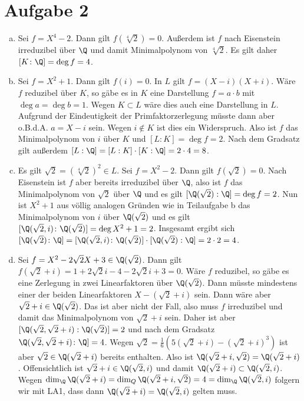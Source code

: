 \documentclass{article}
\begin{document}
    \section*{Aufgabe 2}
    \begin{enumerate}[(a)]
        \item Sei $f = X^4 - 2$. Dann gilt $f(\sqrt[4]{2}) = 0$. 
        Außerdem ist $f$ nach Eisenstein irreduzibel über $\Q$ und damit Minimalpolynom von $\sqrt[4]{2}$.
        Es gilt daher $[K\colon \Q] = \deg f = 4$.
        \item Sei $f = X^2 + 1$. Dann gilt $f(i) = 0$. In $L$ gilt $f = (X - i)(X + i)$. 
        Wäre $f$ reduzibel über $K$, so gäbe es in $K$ eine Darstellung $f = a\cdot b$ mit $\deg a = \deg b = 1$. Wegen $K \subset L$ wäre dies auch eine Darstellung in $L$. Aufgrund der Eindeutigkeit der Primfaktorzerlegung müsste dann aber o.B.d.A. $a = X-i$ sein. Wegen $i \notin K$ ist dies ein Widerspruch. Also ist $f$ das Minimalpolynom von $i$ über $K$ und $[L:K] = \deg f = 2$.
        Nach dem Gradsatz gilt außerdem $[L:\Q] = [L:K] \cdot [K:\Q] = 2 \cdot 4 = 8$.
        \item Es gilt $\sqrt{2} = (\sqrt[4]{2})^2 \in L$. Sei $f = X^2 - 2$. Dann gilt $f(\sqrt{2}) = 0$. Nach Eisenstein ist $f$ aber bereits irreduzibel über $\Q$, also ist $f$ das Minimalpolynom von $\sqrt{2}$ über $\Q$ und es gilt $[\Q(\sqrt{2}):\Q] = \deg f = 2$.
        Nun ist $X^2 + 1$ aus völlig analogen Gründen wie in Teilaufgabe b das Minimalpolynom von $i$ über $\Q(\sqrt{2})$ und es gilt $[\Q(\sqrt{2}, i)\colon \Q(\sqrt{2})] = \deg X^2 + 1 = 2$. Insgesamt ergibt sich $[\Q(\sqrt{2})\colon\Q] = [\Q(\sqrt{2}, i)\colon \Q(\sqrt{2})] \cdot [\Q(\sqrt{2}):\Q] = 2 \cdot 2 = 4$.
        \item Sei $f = X^2 - 2\sqrt{2}X + 3 \in \Q(\sqrt{2})$. Dann gilt $f(\sqrt{2} +i) = 1 + 2\sqrt{2}i - 4 - 2\sqrt{2}i + 3 = 0$. Wäre $f$ reduzibel, so gäbe es eine Zerlegung in zwei Linearfaktoren über $\Q(\sqrt{2})$. Dann müsste mindestens einer der beiden Linearfaktoren $X - (\sqrt{2} + i)$ sein. Dann wäre aber $\sqrt{2} + i \in \Q(\sqrt{2})$. Das ist aber nicht der Fall, also muss $f$ irreduzibel und damit das Minimalpolynom von $\sqrt{2} + i$ sein. Daher ist aber $[\Q(\sqrt{2}, \sqrt{2} + i): \Q(\sqrt{2})] = 2$ und nach dem Gradsatz $\Q(\sqrt{2}, \sqrt{2} + i)\colon \Q] = 4$. Wegen $\sqrt{2} = \frac{1}{6}(5(\sqrt{2} + i) - (\sqrt{2} + i)^3)$ ist aber $\sqrt{2} \in \Q(\sqrt{2} + i)$ bereits enthalten. Also ist $\Q(\sqrt{2} + i, \sqrt{2}) = \Q(\sqrt{2} + i)$.
        Offensichtlich ist $\sqrt{2} + i \in \Q(\sqrt{2}, i)$ und damit $\Q(\sqrt{2} + i) \subset \Q(\sqrt{2},i)$. Wegen $\dim_\Q \Q(\sqrt{2} + i) = \dim_Q \Q(\sqrt{2} + i, \sqrt{2}) = 4 = \dim_\Q \Q(\sqrt{2}, i)$ folgern wir mit LA1, dass dann $\Q(\sqrt{2} + i) = \Q(\sqrt{2}, i)$ gelten muss.
    \end{enumerate}
\end{document}
